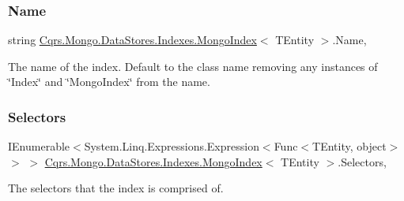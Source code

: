\subsubsection{\texorpdfstring{Name}{Name}}
{\footnotesize\ttfamily string \hyperlink{classCqrs_1_1Mongo_1_1DataStores_1_1Indexes_1_1MongoIndex}{Cqrs.\+Mongo.\+Data\+Stores.\+Indexes.\+Mongo\+Index}$<$ T\+Entity $>$.Name\hspace{0.3cm}{\ttfamily [get]}, {}}



The name of the index. Default to the class name removing any instances of \char`\"{}\+Index\char`\"{} and \char`\"{}\+Mongo\+Index\char`\"{} from the name. 

\mbox{\label{classCqrs_1_1Mongo_1_1DataStores_1_1Indexes_1_1MongoIndex_a43e73501f54becfaee4430a89841055a_a43e73501f54becfaee4430a89841055a}} 
\subsubsection{\texorpdfstring{Selectors}{Selectors}}
{\footnotesize\ttfamily I\+Enumerable$<$System.\+Linq.\+Expressions.\+Expression$<$Func$<$T\+Entity, object$>$ $>$ $>$ \hyperlink{classCqrs_1_1Mongo_1_1DataStores_1_1Indexes_1_1MongoIndex}{Cqrs.\+Mongo.\+Data\+Stores.\+Indexes.\+Mongo\+Index}$<$ T\+Entity $>$.Selectors\hspace{0.3cm}{\ttfamily [get]}, {}}



The selectors that the index is comprised of. 

